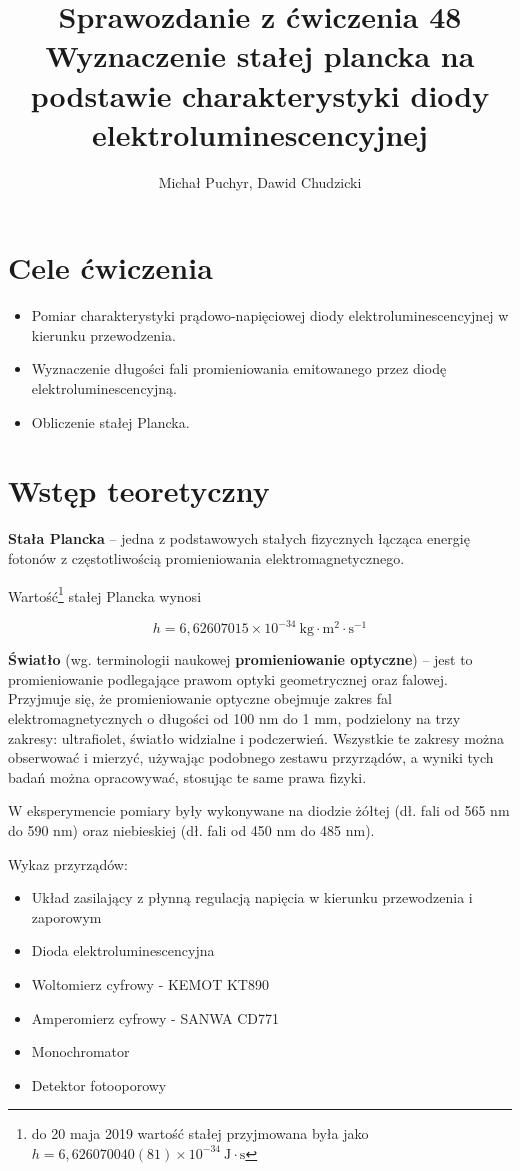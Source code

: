 \documentclass[12pt]{article}
\author{Michał Puchyr, Dawid Chudzicki}
\title{Sprawozdanie z ćwiczenia 48 \\ \textbf{Wyznaczenie stałej plancka na podstawie charakterystyki diody elektroluminescencyjnej}}
\begin{document}
\maketitle

\section{Cele ćwiczenia}
\begin{itemize}
    \item Pomiar charakterystyki prądowo-napięciowej diody elektroluminescencyjnej
    w kierunku przewodzenia.
    \item Wyznaczenie długości fali promieniowania emitowanego przez diodę
    elektroluminescencyjną.
    \item Obliczenie stałej Plancka.
\end{itemize}

\section{Wstęp teoretyczny}

\textbf{Stała Plancka} -- jedna z podstawowych stałych fizycznych łącząca energię
fotonów z częstotliwością promieniowania elektromagnetycznego.

Wartość\footnote{do 20 maja 2019 wartość stałej przyjmowana była jako $ h = 6,626070040(81) \times 10^{-34} \ \textrm{J} \cdot \textrm{s} $} stałej Plancka wynosi 

\[ h = 6,62607015 \times 10^{-34} \ \textrm{kg} \cdot \textrm{m}^2 \cdot \textrm{s}^{-1} \]

\textbf{Światło} (wg. terminologii naukowej \textbf{promieniowanie optyczne}) -- jest to promieniowanie podlegające prawom optyki geometrycznej oraz falowej. 
Przyjmuje się, że promieniowanie optyczne obejmuje zakres fal elektromagnetycznych o długości od 100 nm do 1 mm, 
podzielony na trzy zakresy: ultrafiolet, światło widzialne i podczerwień. Wszystkie te zakresy można obserwować i mierzyć, 
używając podobnego zestawu przyrządów, a wyniki tych badań można opracowywać, stosując te same prawa fizyki. 
\medskip

W eksperymencie pomiary były wykonywane na diodzie żółtej (dł. fali od 565 nm do 590 nm) oraz niebieskiej (dł. fali od 450 nm do 485 nm).
\bigskip

Wykaz przyrządów:
\begin{itemize}
    \item Układ zasilający z płynną regulacją napięcia w kierunku przewodzenia i zaporowym
    \item Dioda elektroluminescencyjna
    \item Woltomierz cyfrowy - KEMOT KT890
    \item Amperomierz cyfrowy - SANWA CD771
    \item Monochromator
    \item Detektor fotooporowy
\end{itemize}
\end{document}
